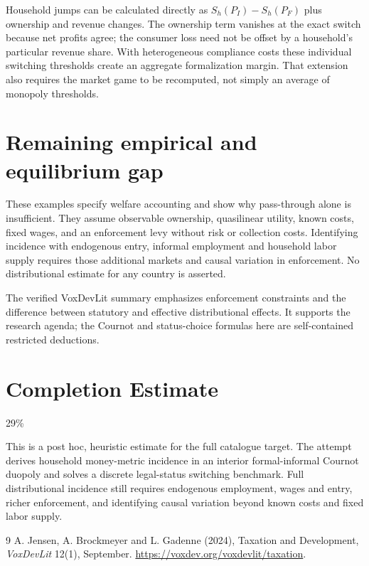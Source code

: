 \documentclass[11pt]{article}
\theoremstyle{remark}\newtheorem{remark}[theorem]{Remark}
\begin{document}
Household jumps can be calculated directly as $S_h(P_I)-S_h(P_F)$ plus ownership and revenue changes. The ownership term vanishes at the exact switch because net profits agree; the consumer loss need not be offset by a household's particular revenue share. With heterogeneous compliance costs these individual switching thresholds create an aggregate formalization margin. That extension also requires the market game to be recomputed, not simply an average of monopoly thresholds.

\section*{Remaining empirical and equilibrium gap}
These examples specify welfare accounting and show why pass-through alone is insufficient. They assume observable ownership, quasilinear utility, known costs, fixed wages, and an enforcement levy without risk or collection costs. Identifying incidence with endogenous entry, informal employment and household labor supply requires those additional markets and causal variation in enforcement. No distributional estimate for any country is asserted.

The verified VoxDevLit summary emphasizes enforcement constraints and the difference between statutory and effective distributional effects. It supports the research agenda; the Cournot and status-choice formulas here are self-contained restricted deductions.

\section{Completion Estimate}
29\%

This is a post hoc, heuristic estimate for the full catalogue target.
The attempt derives household money-metric incidence in an interior formal-informal Cournot duopoly and solves a discrete legal-status switching benchmark. Full distributional incidence still requires endogenous employment, wages and entry, richer enforcement, and identifying causal variation beyond known costs and fixed labor supply.

\begin{thebibliography}{9}
 A. Jensen, A. Brockmeyer and L. Gadenne (2024), Taxation and Development, \emph{VoxDevLit} 12(1), September. \url{https://voxdev.org/voxdevlit/taxation}.
\end{thebibliography}
\end{document}
